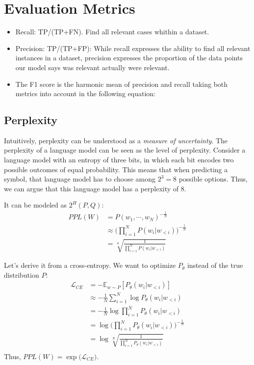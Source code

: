 \section{Evaluation Metrics}
\label{sec:nlp_eval_metrics}

\begin{itemize}
	\item Recall: TP/(TP+FN). Find all relevant cases whithin a dataset.
	\item Precision: TP/(TP+FP): While recall expresses the ability to find all relevant instances in a dataset, precision expresses the proportion of the data points our model says was relevant actually were relevant.
	\item The F1 score is the harmonic mean of precision and recall taking both metrics into account in the following equation:
\end{itemize}

\subsection{Perplexity}

Intuitively, perplexity can be understood as a \textit{measure of uncertainty}. The perplexity of a language model can be seen as the level of perplexity. Consider a language model with an entropy of three bits, in which each bit encodes two possible outcomes of equal probability. This means that when predicting a symbol, that language model has to choose among $2^3=8$ possible options. Thus, we can argue that this language model has a perplexity of 8.

It can be modeled as $2^H(P,Q)$:
\begin{align*}
	PPL(W) &= P(w_1,\cdots, w_N)^{-\frac{1}{N}}\\
	&\approx \Bigg(\prod_{i=1}^N P(w_i|w_{<i})\Bigg)^{-\frac{1}{N}}\\
	&= \sqrt[n]{\frac{1}{\prod_{i=1}^{N} P(w_{i}|w_{<i})}}
\end{align*}

Let's derive it from a cross-entropy. We want to optimize $P_\theta$ instead of the true distribution $P$:
\begin{align}
	\mathcal{L}_{CE} &= -\mathbb{E}_{w\sim P} [P_\theta(w_{i}|w_{<i})]\\
	&\approx -\frac{1}{N} \sum_{i=1}^{N} \log P_\theta(w_{i}|w_{<i})\\
	&= -\frac{1}{N} \log \prod_{i=1}^{N} P_\theta(w_{i}|w_{<i})\\
	&=  \log \Bigg(\prod_{i=1}^{N} P_\theta(w_{i}|w_{<i}) \Bigg)^{-\frac{1}{N}}\\
	&=  \log \sqrt[N]{\frac{1}{\prod_{i=1}^{N} P_\theta(w_{i}|w_{<i})}}\\
	\label{eq:ppl_entropy}
\end{align}
Thus, $PPL(W) = \exp\Big(\mathcal{L}_{CE}\Big).$

